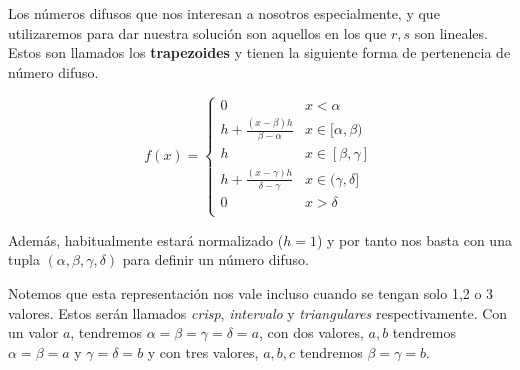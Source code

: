 Los números difusos que nos interesan a nosotros especialmente, y que utilizaremos para dar nuestra solución son aquellos en los que $r,s$ son lineales. Estos son llamados los \textbf{trapezoides} y tienen la siguiente forma de pertenencia de número difuso.

\begin{equation}\label{trapezoidrepresentation}
    f(x) = \left\{ { \begin{array}{cc}
                    0 & x < \alpha \\ 
                    h + \frac{(x-\beta)h}{\beta-\alpha} & x\in [\alpha,\beta) \\
                    h & x\in [\beta,\gamma] \\
                    h + \frac{(x-\gamma)h}{\delta-\gamma} & x\in (\gamma,\delta] \\
                    0 & x > \delta \\ 
                    \end{array}  } \right.
\end{equation}

Además, habitualmente estará normalizado ($h=1$) y por tanto nos basta con una tupla $(\alpha, \beta, \gamma, \delta)$ para definir un número difuso.

\begin{remark}\label{notaciontrapezoide}
Notemos que esta representación nos vale incluso cuando se tengan solo 1,2 o 3 valores. Estos serán llamados \textit{crisp}, \textit{intervalo} y \textit{triangulares} respectivamente. Con un valor $a$, tendremos $\alpha = \beta = \gamma = \delta = a$, con dos valores, $a,b$ tendremos $\alpha = \beta = a$ y $\gamma = \delta = b$ y con tres valores, $a,b,c$ tendremos $\beta = \gamma = b$.
\end{remark}
